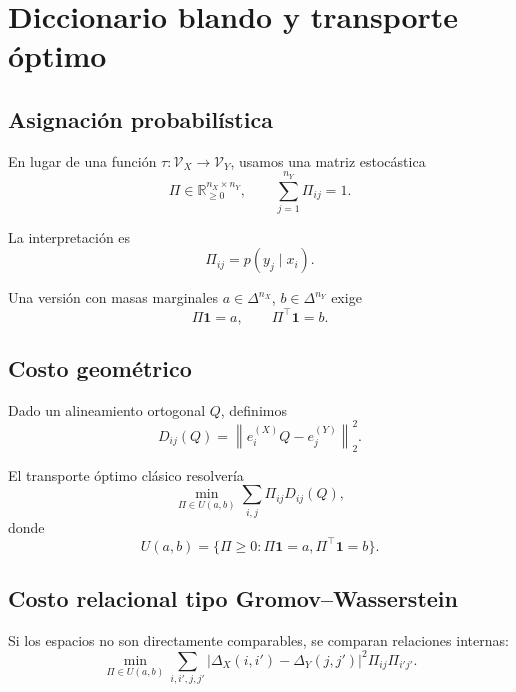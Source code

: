 \documentclass[11pt,a4paper]{article}
\newcommand{\R}{\mathbb{R}}
\newcommand{\1}{\mathbf{1}}
\newcommand{\norm}[1]{\left\lVert #1 \right\rVert}
\newcommand{\VX}{\mathcal{V}_X}
\newcommand{\VY}{\mathcal{V}_Y}
\newcommand{\DX}{\Delta_X}
\newcommand{\DY}{\Delta_Y}
\numberwithin{equation}{section}
\begin{document}
\section{Diccionario blando y transporte óptimo}

\subsection{Asignación probabilística}

En lugar de una función \(\tau:\VX\to\VY\), usamos una matriz estocástica
\begin{equation}
    \Pi\in\R_{\geq 0}^{n_X\times n_Y},
    \qquad
    \sum_{j=1}^{n_Y}\Pi_{ij}=1.
\end{equation}

La interpretación es
\[
    \Pi_{ij}=p(y_j\mid x_i).
\]

Una versión con masas marginales \(a\in\Delta^{n_X}\), \(b\in\Delta^{n_Y}\) exige
\begin{equation}
    \Pi\mathbf{1}=a,
    \qquad
    \Pi^\top\mathbf{1}=b.
\end{equation}

\subsection{Costo geométrico}

Dado un alineamiento ortogonal \(Q\), definimos
\begin{equation}
    D_{ij}(Q)=\norm{e_i^{(X)}Q-e_j^{(Y)}}_2^2.
\end{equation}

El transporte óptimo clásico resolvería
\begin{equation}
    \min_{\Pi\in U(a,b)}
    \sum_{i,j}\Pi_{ij}D_{ij}(Q),
    \label{eq:ot}
\end{equation}
donde
\[
    U(a,b)=\{\Pi\geq 0:\Pi\mathbf{1}=a,\Pi^\top\mathbf{1}=b\}.
\]

\subsection{Costo relacional tipo Gromov--Wasserstein}

Si los espacios no son directamente comparables, se comparan relaciones internas:
\begin{equation}
    \min_{\Pi\in U(a,b)}
    \sum_{i,i',j,j'}
    \left|
    \DX(i,i')-\DY(j,j')
    \right|^2
    \Pi_{ij}\Pi_{i'j'}.
    \label{eq:gw}
\end{equation}
\end{document}
